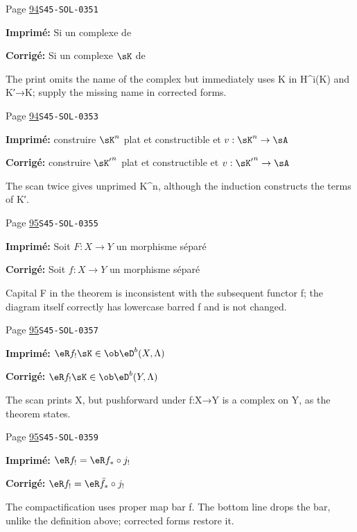 \begin{description}
\smallskip
\item[\hypertarget{apparatus:FR-0044}{44}] Page \hyperlink{printpage:fr:94}{94}\quad\texttt{S45-SOL-0351}
\par\noindent\textbf{Imprimé:} Si un complexe de
\par\noindent\textbf{Corrigé:} Si un complexe $\sK$ de
\par\noindent The print omits the name of the complex but immediately uses K in H\textasciicircum{}i(K) and K′→K; supply the missing name in corrected forms.
\smallskip
\item[\hypertarget{apparatus:FR-0045}{45}] Page \hyperlink{printpage:fr:94}{94}\quad\texttt{S45-SOL-0353}
\par\noindent\textbf{Imprimé:} construire $\sK^n$ plat et constructible et $v:\sK^n\to \sA$
\par\noindent\textbf{Corrigé:} construire ${\sK'}^n$ plat et constructible et $v:{\sK'}^n\to \sA$
\par\noindent The scan twice gives unprimed K\textasciicircum{}n, although the induction constructs the terms of K′.
\smallskip
\item[\hypertarget{apparatus:FR-0046}{46}] Page \hyperlink{printpage:fr:95}{95}\quad\texttt{S45-SOL-0355}
\par\noindent\textbf{Imprimé:} Soit $F:X\to Y$ un morphisme séparé
\par\noindent\textbf{Corrigé:} Soit $f:X\to Y$ un morphisme séparé
\par\noindent Capital F in the theorem is inconsistent with the subsequent functor f; the diagram itself correctly has lowercase barred f and is not changed.
\smallskip
\item[\hypertarget{apparatus:FR-0047}{47}] Page \hyperlink{printpage:fr:95}{95}\quad\texttt{S45-SOL-0357}
\par\noindent\textbf{Imprimé:} $\eR f_!\sK\in \ob \eD^b(X,\Lambda)$
\par\noindent\textbf{Corrigé:} $\eR f_!\sK\in \ob \eD^b(Y,\Lambda)$
\par\noindent The scan prints X, but pushforward under f:X→Y is a complex on Y, as the theorem states.
\smallskip
\item[\hypertarget{apparatus:FR-0048}{48}] Page \hyperlink{printpage:fr:95}{95}\quad\texttt{S45-SOL-0359}
\par\noindent\textbf{Imprimé:} $\eR f_! = \eR f_*\circ j_!$
\par\noindent\textbf{Corrigé:} $\eR f_! = \eR \bar f_*\circ j_!$
\par\noindent The compactification uses proper map bar f. The bottom line drops the bar, unlike the definition above; corrected forms restore it.

\end{description}
